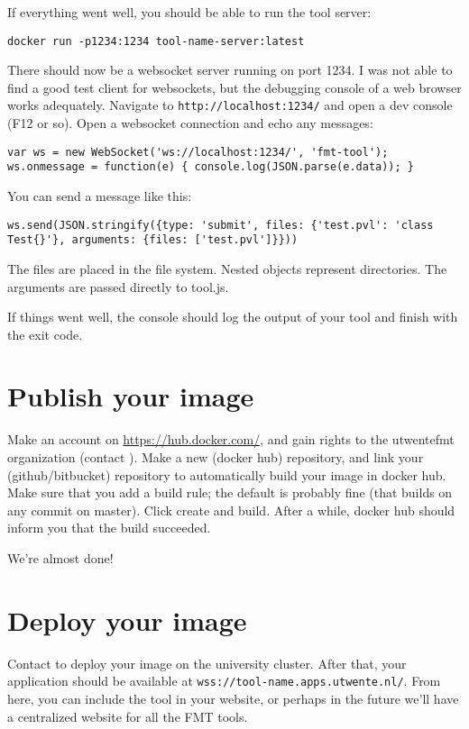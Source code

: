 \documentclass{article}
\begin{document}
If everything went well, you should be able to run the tool server:

\begin{lstlisting}
docker run -p1234:1234 tool-name-server:latest
\end{lstlisting}

There should now be a websocket server running on port 1234. I was not able to find a good test client for websockets, but the debugging console of a web browser works adequately. Navigate to \texttt{http://localhost:1234/} and open a dev console (F12 or so). Open a websocket connection and echo any messages:

\begin{lstlisting}
var ws = new WebSocket('ws://localhost:1234/', 'fmt-tool'); ws.onmessage = function(e) { console.log(JSON.parse(e.data)); }
\end{lstlisting}

You can send a message like this:

\begin{lstlisting}
ws.send(JSON.stringify({type: 'submit', files: {'test.pvl': 'class Test{}'}, arguments: {files: ['test.pvl']}}))
\end{lstlisting}

The files are placed in the file system. Nested objects represent directories. The arguments are passed directly to tool.js.

If things went well, the console should log the output of your tool and finish with the exit code.

\section{Publish your image}
Make an account on \url{https://hub.docker.com/}, and gain rights to the utwentefmt organization (contact \dockerHubAdmin). Make a new (docker hub) repository, and link your (github/bitbucket) repository to automatically build your image in docker hub. Make sure that you add a build rule; the default is probably fine (that builds on any commit on master). Click create and build. After a while, docker hub should inform you that the build succeeded.

We're almost done!

\section{Deploy your image}
Contact \utrancherAdmin{} to deploy your image on the university cluster. After that, your application should be available at \texttt{wss://tool-name.apps.utwente.nl/}. From here, you can include the tool in your website, or perhaps in the future we'll have a centralized website for all the FMT tools.
\end{document}
